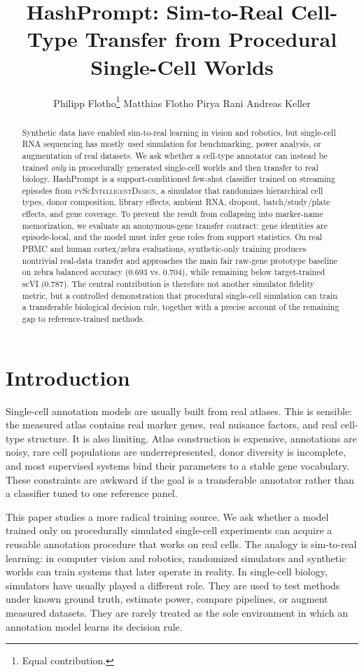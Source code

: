 \documentclass{article}
\title{HashPrompt: Sim-to-Real Cell-Type Transfer from Procedural Single-Cell Worlds}
\author{%
  Philipp Flotho\thanks{Equal contribution.}
  \And
  Matthias Flotho\footnotemark[1]
  \And
  Pirya Rani
  \And
  Andreas Keller
}
\begin{document}
\maketitle

\begin{abstract}
Synthetic data have enabled sim-to-real learning in vision and robotics, but single-cell RNA sequencing has mostly used simulation for benchmarking, power analysis, or augmentation of real datasets. We ask whether a cell-type annotator can instead be trained \emph{only} in procedurally generated single-cell worlds and then transfer to real biology. HashPrompt is a support-conditioned few-shot classifier trained on streaming episodes from \textsc{pyScIntelligentDesign}, a simulator that randomizes hierarchical cell types, donor composition, library effects, ambient RNA, dropout, batch/study/plate effects, and gene coverage. To prevent the result from collapsing into marker-name memorization, we evaluate an anonymous-gene transfer contract: gene identities are episode-local, and the model must infer gene roles from support statistics. On real PBMC and human cortex/zebra evaluations, synthetic-only training produces nontrivial real-data transfer and approaches the main fair raw-gene prototype baseline on zebra balanced accuracy (0.693 vs. 0.704), while remaining below target-trained scVI (0.787). The central contribution is therefore not another simulator fidelity metric, but a controlled demonstration that procedural single-cell simulation can train a transferable biological decision rule, together with a precise account of the remaining gap to reference-trained methods.
\end{abstract}

\section{Introduction}

Single-cell annotation models are usually built from real atlases. This is sensible: the measured atlas contains real marker genes, real nuisance factors, and real cell-type structure. It is also limiting. Atlas construction is expensive, annotations are noisy, rare cell populations are underrepresented, donor diversity is incomplete, and most supervised systems bind their parameters to a stable gene vocabulary. These constraints are awkward if the goal is a transferable annotator rather than a classifier tuned to one reference panel.

This paper studies a more radical training source. We ask whether a model trained only on procedurally simulated single-cell experiments can acquire a reusable annotation procedure that works on real cells. The analogy is sim-to-real learning: in computer vision and robotics, randomized simulators and synthetic worlds can train systems that later operate in reality. In single-cell biology, simulators have usually played a different role. They are used to test methods under known ground truth, estimate power, compare pipelines, or augment measured datasets. They are rarely treated as the sole environment in which an annotation model learns its decision rule.
\end{document}
